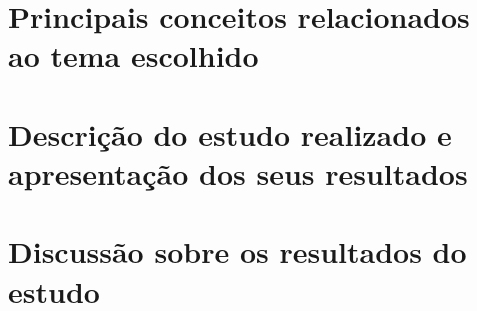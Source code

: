 \documentclass[12pt]{article}
\begin{document}
	
	
	\section{Principais conceitos relacionados ao tema escolhido} \label{sec:conceitos}
	

	
	\section{Descrição do estudo realizado e apresentação dos seus resultados} \label{sec:caso}
	
	
	
	\section{Discussão sobre os resultados do estudo} \label{sec:resultados}

	
	
	
	
\end{document}
